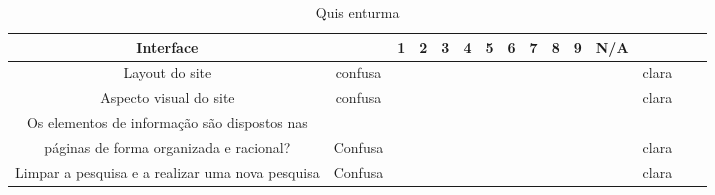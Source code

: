 \begin{itemize}
\begin{table}[H]
\begin{tabular}{|c|c|c|c|c|c|c|c|c|c|c|c|c|c|c|}
		\hline
		\textbf{Interface} &  & 1 & 2 & 3 & 4 & 5 & 6 & 7 & 8 & 9 & N/A &  \\
		\hline  
		  Layout do site & confusa &  &  &  &  &  &  &  &  &  &  & clara \\ 
		\hline
		  Aspecto visual do site & confusa &  &  &  &  &  &  &  &  &  &  & clara \\ 
		\hline
		  Os elementos de informação são dispostos nas\\ páginas de forma organizada e racional?  & Confusa &  &  &  &  &  &  &  &  &  &  & clara \\ 
		\hline
		Limpar a pesquisa e a realizar uma nova pesquisa & Confusa &  &  &  &  &  &  &  &  &  &  & clara \\ 
		\hline

	\end{tabular}
	\caption {Quis enturma}

\end{table}

\end{itemize}